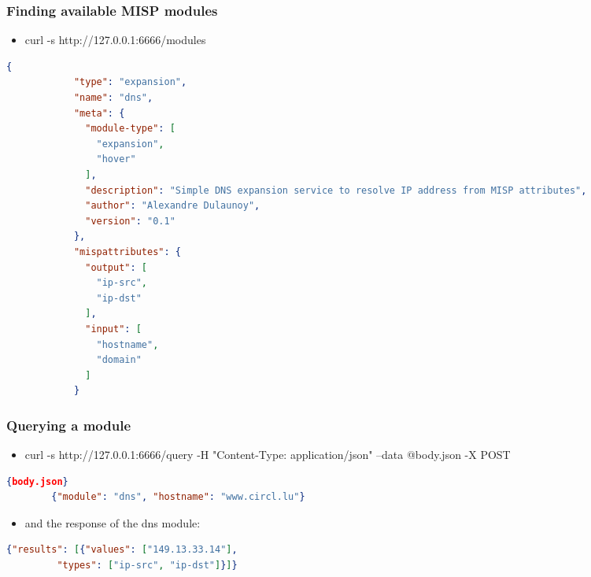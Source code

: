 \begin{frame}[fragile]
        \frametitle{Finding available MISP modules}
        \begin{itemize}
                \item curl -s http://127.0.0.1:6666/modules
        \end{itemize}
        \begin{adjustbox}{width=\textwidth,height=6cm,keepaspectratio}
        \begin{lstlisting}[language=json,firstnumber=1]
            {
            "type": "expansion",
            "name": "dns",
            "meta": {
              "module-type": [
                "expansion",
                "hover"
              ],
              "description": "Simple DNS expansion service to resolve IP address from MISP attributes",
              "author": "Alexandre Dulaunoy",
              "version": "0.1"
            },
            "mispattributes": {
              "output": [
                "ip-src",
                "ip-dst"
              ],
              "input": [
                "hostname",
                "domain"
              ]
            }
        \end{lstlisting}
        \end{adjustbox}
\end{frame}

\begin{frame}[fragile]
        \frametitle{Querying a module}
        \begin{itemize}
                \item curl -s http://127.0.0.1:6666/query -H "Content-Type: application/json" --data @body.json -X POST
        \end{itemize}
        \begin{lstlisting}[language=json,firstnumber=1]{body.json}
        {"module": "dns", "hostname": "www.circl.lu"}
        \end{lstlisting}
        \begin{itemize}
                \item and the response of the dns module:
        \end{itemize}
        \begin{lstlisting}[language=json,firstnumber=1]
        {"results": [{"values": ["149.13.33.14"],
         "types": ["ip-src", "ip-dst"]}]}
        \end{lstlisting}
\end{frame}

